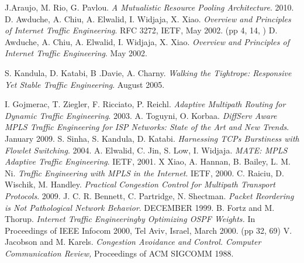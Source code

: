 \documentclass[mres]{ucl_thesis}
\begin{document}

\begin{thebibliography}{9}
J.Araujo, M. Rio, G. Pavlou. \emph{A Mutualistic Resource Pooling Architecture}.   2010.
D. Awduche, A. Chiu, A. Elwalid, I. Widjaja, X. Xiao. \emph{Overview and Principles of Internet Traffic Engineering}. RFC 3272, IETF, May 2002. (pp 4, 14, )
D. Awduche, A. Chiu, A. Elwalid, I. Widjaja, X. Xiao. \emph{Overview and Principles of Internet Traffic Engineering}. May 2002.

S. Kandula, D. Katabi, B .Davie, A. Charny. \emph{Walking the Tightrope: Responsive Yet Stable Traffic Engineering}. August 2005. 

I. Gojmerac, T. Ziegler, F. Ricciato, P. Reichl. \emph{Adaptive Multipath Routing for Dynamic Traffic Engineering}. 2003.
A. Toguyni, O. Korbaa. \emph{DiffServ Aware MPLS Traffic
Engineering for ISP Networks: State of the Art and New Trends}. January 2009.
S. Sinha, S. Kandula, D. Katabi. \emph{Harnessing TCPs Burstiness with Flowlet Switching}. 2004. 
A. Elwalid, C. Jin, S. Low, I. Widjaja. \emph{MATE: MPLS Adaptive Traffic Engineering}. IETF, 2001. 
X Xiao, A. Hannan, B. Bailey, L. M. Ni. \emph{Traffic Engineering with MPLS in the Internet}. IETF, 2000. 
C. Raiciu, D. Wischik, M. Handley. \emph{Practical Congestion Control for Multipath Transport Protocols}. 2009.
J. C. R. Bennett, C. Partridge, N. Shectman. \emph{Packet Reordering is Not Pathological Network Behavior}. DECEMBER 1999.  
B. Fortz and M. Thorup. \emph{Internet Traffic Engineeringby Optimizing OSPF Weights.} In Proceedings of IEEE Infocom 2000, Tel Aviv, Israel, March 2000. (pp 32, 69)
V. Jacobson and M. Karels. \emph{Congestion Avoidance and Control. Computer Communication Review,} Proceedings of ACM SIGCOMM 1988.


\end{thebibliography}
\end{document}

